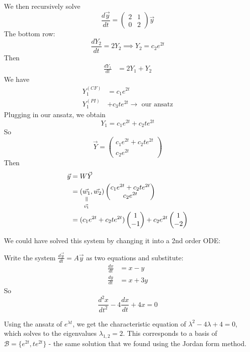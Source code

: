 \documentclass[10pt]{scrartcl}
\renewcommand{\l}{\lambda}
\begin{document}
\begin{example}
We then recursively solve
\[
  \frac{d\vec{y}}{dt}
  = 
  \begin{pmatrix}
  2 & 1\\ 0 & 2
\end{pmatrix}\vec{y}
\]
The bottom row: 
\[
  \frac{dY_2}{dt} = 2Y_2 \implies Y_2 = c_2e^{2t}
\]
Then
\begin{align*}
  \frac{dY_1}{dt} &= 2Y_1 + Y_2
\end{align*}
We have 
\begin{align*}
 Y_1^{(CF)} &= c_1e^{2t} \\
 Y_1^{(PI)} &+ c_3te^{2t}\longrightarrow  \text{ our ansatz}
\end{align*}
Plugging in our ansatz, we obtain
\[
  Y_1 = c_1e^{2t} + c_2te^{2t}
\]
So 
\[
  \vec{Y} = 
  \begin{pmatrix}
  c_1e^{2t} + c_2te^{2t}\\
  c_2e^{2t}
\end{pmatrix}
\]	
Then 
\begin{align*}
  \vec{y} &= W\vec{Y}\\
  &= (\equalto{\vec{w_1}}{\vec{v_1}},\vec{w_2})
  \begin{pmatrix}
   c_1e^{2t} + c_2te^{2t}\\
  c_2e^{2t}
\end{pmatrix}\\
&= (c_1e^{2t} + c_2te^{2t})
\begin{pmatrix}
  1 \\ -1
\end{pmatrix}
+ c_2e^{2t}
\begin{pmatrix}
  1\\ -2
\end{pmatrix}
\end{align*}
\end{example}

We could have solved this system by changing it into a 2nd order ODE: 

Write the system $\frac{d\vec{y}}{dt} = A\vec{y}$ as two equations and substitute:
\begin{align*}
  \frac{dx}{dt} &= x-y \\
  \frac{dy}{dt} &= x + 3y
\end{align*}
So 
\[
  \frac{d^2x}{dt^2} - 4\frac{dx}{dt} + 4x = 0
\]

Using the ansatz of $e^{\lambda t}$, we get the characteristic equation of $\l^2 -4\l + 4 = 0$, which solves to the eigenvalues $\l_{1,2} = 2$. This corresponds to a basis of $\mathcal{B} = \{e^{2t},te^{2t}\}$ - the same solution that we found using the Jordan form method.
\end{document}
